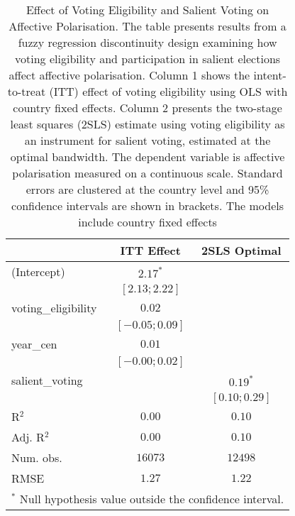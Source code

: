 
\begin{table}
\begin{center}
\begin{tabular}{l c c}
\hline
 & ITT Effect & 2SLS Optimal \\
\hline
(Intercept)         & $2.17^{*}$       &                 \\
                    & $ [ 2.13; 2.22]$ &                 \\
voting\_eligibility & $0.02$           &                 \\
                    & $ [-0.05; 0.09]$ &                 \\
year\_cen           & $0.01$           &                 \\
                    & $ [-0.00; 0.02]$ &                 \\
salient\_voting     &                  & $0.19^{*}$      \\
                    &                  & $ [0.10; 0.29]$ \\
\hline
R$^2$               & $0.00$           & $0.10$          \\
Adj. R$^2$          & $0.00$           & $0.10$          \\
Num. obs.           & $16073$          & $12498$         \\
RMSE                & $1.27$           & $1.22$          \\
\hline
\multicolumn{3}{l}{\scriptsize{$^*$ Null hypothesis value outside the confidence interval.}}
\end{tabular}
\caption{Effect of Voting Eligibility and Salient Voting on Affective Polarisation. The table presents results from a fuzzy regression discontinuity design examining how voting eligibility and participation in salient elections affect affective polarisation. Column 1 shows the intent-to-treat (ITT) effect of voting eligibility using OLS with country fixed effects. Column 2 presents the two-stage least squares (2SLS) estimate using voting eligibility as an instrument for salient voting, estimated at the optimal bandwidth. The dependent variable is affective polarisation measured on a continuous scale. Standard errors are clustered at the country level and 95\% confidence intervals are shown in brackets. The models include country fixed effects}
\label{table:main_results}
\end{center}
\end{table}
